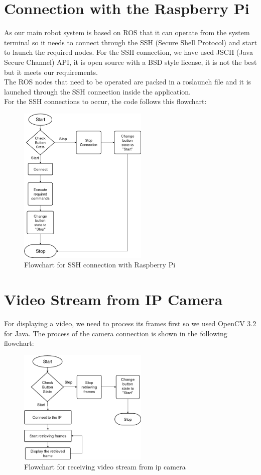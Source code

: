 \documentclass[12pt]{book}
\begin{document}
\section{Connection with the Raspberry Pi}
As our main robot system is based on ROS that it can operate from the system terminal so it needs to connect through the SSH (Secure Shell Protocol) and start to launch the required nodes. For the SSH connection, we have used JSCH (Java Secure Channel) API, it is open source with a BSD style license, it is not the best but it meets our requirements.\\
The ROS nodes that need to be operated are packed in a roslaunch file and it is launched through the SSH connection inside the application.\\
For the SSH connections to occur, the code follows this flowchart:

\begin{figure}
	\centering
	\includegraphics[width =0.55\textwidth]{Fig/connection-flowchart.jpg}
	\caption{Flowchart for SSH connection with Raspberry Pi}
	\label{fig:connection-flowchart}
\end{figure}


\section{Video Stream from IP Camera}
For displaying a video, we need to process its frames first so we used OpenCV 3.2 for Java. The process of the camera connection is shown in the following flowchart:
\begin{figure}
	\centering
	\includegraphics[width =0.55\textwidth]{Fig/camera-flowchart.jpg}
	\caption{Flowchart for receiving video stream from ip camera}
	\label{fig:camera-flowchart}
\end{figure}
\end{document}
